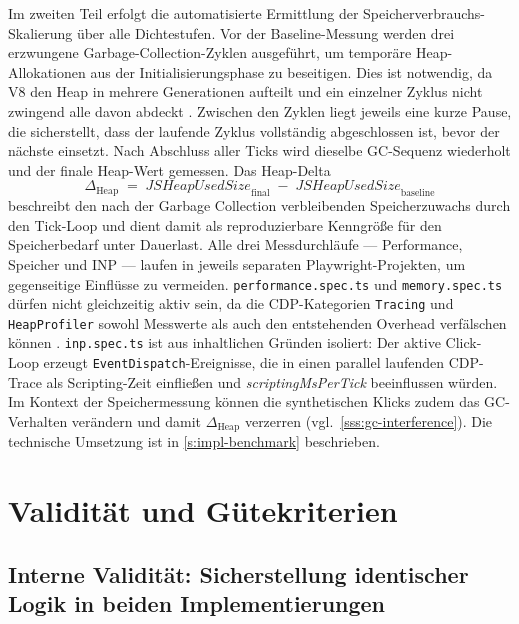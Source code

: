 Im zweiten Teil erfolgt die automatisierte Ermittlung der Speicherverbrauchs-Skalierung über alle Dichtestufen. Vor der Baseline-Messung werden drei erzwungene Garbage-Collection-Zyklen ausgeführt, um temporäre Heap-Allokationen aus der Initialisierungsphase zu beseitigen. Dies ist notwendig, da V8 den Heap in mehrere Generationen aufteilt und ein einzelner Zyklus nicht zwingend alle davon abdeckt \cite{v8.dev_fiber-2019}. Zwischen den Zyklen liegt jeweils eine kurze Pause, die sicherstellt, dass der laufende Zyklus vollständig abgeschlossen ist, bevor der nächste einsetzt. Nach Abschluss aller Ticks wird dieselbe GC-Sequenz wiederholt und der finale Heap-Wert gemessen. Das Heap-Delta
\begin{equation}
	\Delta_{\mathrm{Heap}} \;=\; \textit{JSHeapUsedSize}_{\mathrm{final}} \;-\; \textit{JSHeapUsedSize}_{\mathrm{baseline}}
\end{equation}
beschreibt den nach der Garbage Collection verbleibenden Speicherzuwachs durch den Tick-Loop und dient damit als reproduzierbare Kenngröße für den Speicherbedarf unter Dauerlast. Alle drei Messdurchläufe — Performance, Speicher und INP — laufen in jeweils separaten Playwright-Projekten, um gegenseitige Einflüsse zu vermeiden. \texttt{performance.spec.ts} und \texttt{memory.spec.ts} dürfen nicht gleichzeitig aktiv sein, da die CDP-Kategorien \texttt{Tracing} und \texttt{HeapProfiler} sowohl Messwerte als auch den entstehenden Overhead verfälschen können \cite{chromium-heap-profiling}. \texttt{inp.spec.ts} ist aus inhaltlichen Gründen isoliert: Der aktive Click-Loop erzeugt \texttt{EventDispatch}-Ereignisse, die in einen parallel laufenden CDP-Trace als Scripting-Zeit einfließen und \textit{scriptingMsPerTick} beeinflussen würden. Im Kontext der Speichermessung können die synthetischen Klicks zudem das GC-Verhalten verändern und damit $\Delta_{\mathrm{Heap}}$ verzerren (vgl.~\cref{sss:gc-interference}). Die technische Umsetzung ist in \cref{s:impl-benchmark} beschrieben.

\section{Validität und Gütekriterien}
\label{s:validity}

\subsection{Interne Validität: Sicherstellung identischer Logik in beiden Implementierungen}
\label{ss:internal-validity}


